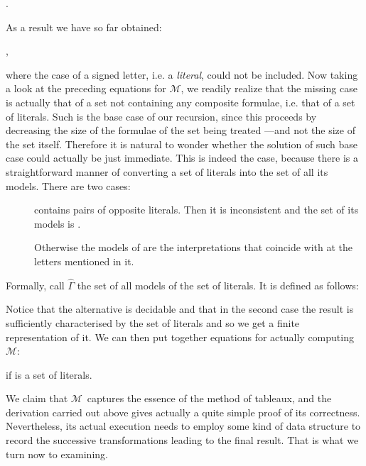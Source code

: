 \documentclass[a4paper,UKenglish]{lipics}
\newcounter{c}
\newcommand{\dit}{}
\newcommand{\allmodels}{\ensuremath{\mathcal{M}}}
\newcommand{\lmods}[1]{\ensuremath{\hat{#1}}}
\begin{document}
.



\noindent As a result we have so far obtained:







,



\noindent where the case of a signed letter, i.e. a \emph{literal}, could not be included. Now taking a look at the preceding equations for \allmodels, we readily realize that the missing case is actually that of a set not containing any composite formulae, i.e. that of a set of literals. Such is the base case of our recursion, since this proceeds by decreasing the size of the formulae of the set being treated ---and not the size of the set itself.
Therefore it is natural to wonder whether the solution of such base case could actually be just immediate.
This is indeed the case, because there is a straightforward manner of converting a set  of literals into the set of all its models. There are two cases:\begin{description}
\item[\dit]  contains pairs of opposite literals. Then it is inconsistent and the set of its models is .
\item[\dit] Otherwise the models of  are the interpretations that coincide with  at the letters mentioned in it.
\end{description}
Formally, call \lmods{\Gamma} the set of all models of the set  of literals. It is defined as follows:



\noindent Notice that the alternative is decidable and that in the second case the result is sufficiently characterised by the set  of literals and so we get a finite representation of it.
We can then put together equations for actually computing \allmodels:











 if  is a set of literals.

We claim that \allmodels\ captures the essence of the method of tableaux, and the derivation carried out above gives actually a quite simple proof of its correctness. Nevertheless, its actual execution needs to employ some kind of data structure to record the successive transformations leading to the final result. That is what we turn now to examining.
\end{document}
